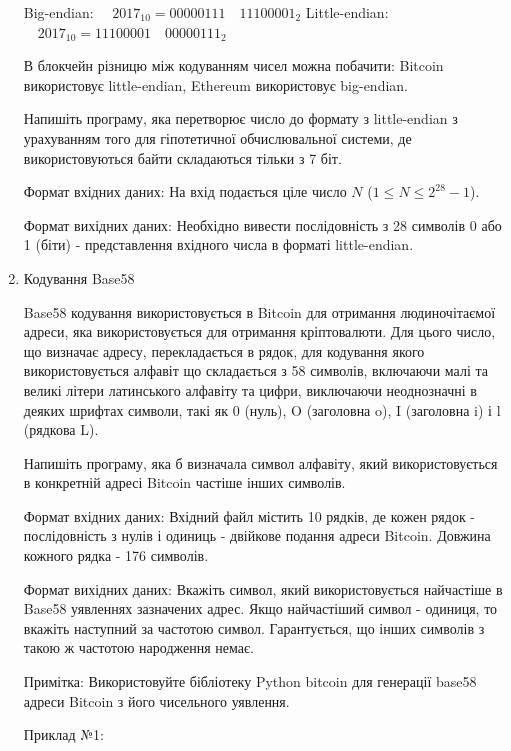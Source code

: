 \documentclass[]{article}
\begin{document}
\begin{enumerate}
Big-endian: $ \quad 2017_{10} = 00000111 \quad 11100001_{2}$
Little-endian:$ \quad 2017_{10} = 11100001\quad 00000111_{2} $

В блокчейн різницю між кодуванням чисел можна побачити: Bitcoin використовує little-endian, Ethereum використовує big-endian.

Напишіть програму, яка перетворює число до формату з little-endian з урахуванням того для гіпотетичної обчислювальної системи, де використовуються байти складаються тільки з 7 біт.

Формат вхідних даних:
На вхід подається ціле число $N $ ($1\le N \le 2^{28}-1 $).

Формат вихідних даних:
Необхідно вивести послідовність з 28 символів 0 або 1 (біти) - представлення вхідного числа в форматі little-endian.

\item
Кодування Base58

Base58 кодування використовується в Bitcoin для отримання людиночітаємої адреси, яка використовується для отримання
кріптовалюти. Для цього число, що визначає адресу, перекладається в рядок, для кодування якого використовується алфавіт
що складається з 58 символів, включаючи малі та великі літери латинського алфавіту та цифри, виключаючи неоднозначні в
деяких шрифтах символи, такі як 0 (нуль), O (заголовна o), I (заголовна i) і l (рядкова L).

Напишіть програму, яка б визначала символ алфавіту, який використовується в конкретній адресі Bitcoin частіше
інших символів.

Формат вхідних даних:
Вхідний файл містить 10 рядків, де кожен рядок - послідовність з нулів і одиниць - двійкове подання адреси Bitcoin. Довжина кожного рядка - 176 символів.

Формат вихідних даних:
Вкажіть символ, який використовується найчастіше в Base58 уявленнях зазначених адрес. Якщо найчастіший символ -
одиниця, то вкажіть наступний за частотою символ. Гарантується, що інших символів з такою ж частотою народження
немає.

Примітка:
Використовуйте бібліотеку Python bitcoin для генерації base58 адреси Bitcoin з його чисельного уявлення.

Приклад №1:


\end{enumerate}
\end{document}

